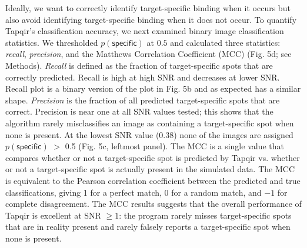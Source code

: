 

Ideally, we want to correctly identify target-specific binding when it occurs but also avoid identifying target-specific binding when it does not occur. To quantify Tapqir's classification accuracy, we next examined binary image classification statistics. We thresholded $p(\mathsf{specific})$ at $0.5$ and calculated three statistics: \textit{recall}, \textit{precision}, and the Matthews Correlation Coefficient (MCC) \cite{Matthews1975-rw} (Fig. 5d; see Methods). \textit{Recall} is defined as the fraction of target-specific spots that are correctly predicted. Recall is high at high SNR and decreases at lower SNR. Recall plot is a binary version of the plot in Fig. 5b and as expected has a similar shape. \textit{Precision} is the fraction of all predicted target-specific spots that are correct. Precision is near one at all SNR values tested; this shows that the algorithm rarely misclassifies an image as containing a target-specific spot when none is present. At the lowest SNR value (0.38) none of the images are assigned $p(\mathsf{specific})$ $>$ 0.5 (Fig. 5c, leftmost panel). The MCC is a single value that compares whether or not a target-specific spot is predicted by Tapqir vs. whether or not a target-specific spot is actually present in the simulated data.  The MCC is equivalent to the Pearson correlation coefficient between the predicted and true classifications, giving 1 for a perfect match, 0 for a random match, and $-1$ for complete disagreement. The MCC results suggests that the overall performance of Tapqir is excellent at SNR $\ge 1$: the program rarely misses target-specific spots that are in reality present and rarely falsely reports a target-specific spot when none is present.  

